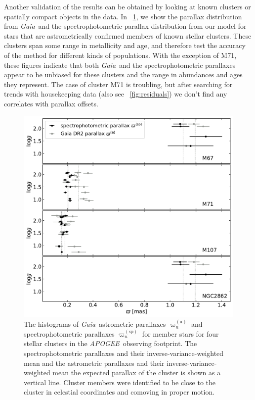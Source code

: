 \documentclass[modern]{aastex62}
\newcommand{\acronym}[1]{{\small{#1}}}
\newcommand{\project}[1]{\textsl{#1}}
\newcommand{\apogee}{\project{\acronym{APOGEE}}}
\newcommand{\gaia}{\project{Gaia}}
\newcommand{\gparallax}{\varpi^{(\mathrm{a})}}
\newcommand{\sparallax}{\varpi^{(\mathrm{sp})}}
\begin{document}
Another validation of the results can be obtained by looking at known
clusters or spatially compact objects in the data.
In \figurename~\ref{fig:clusters}, we show the parallax distribution from \gaia\ and
the spectrophotometric-parallax distribution from our model for stars that are
astrometrically confirmed members of known stellar clusters.
These clusters span some range in metallicity and age, and therefore test
the accuracy of the method for different kinds of populations.
With the exception of \acronym{M71}, these figures 
indicate that both \gaia\ and the spectrophotometric parallaxes appear to be unbiased
for these clusters and the range in abundances and ages they represent.
The case of cluster \acronym{M71} is troubling, but after searching for trends with
housekeeping data (also see \figurename~\ref{fig:residuals}) we don't find any correlates
with parallax offsets.
\begin{figure}
\includegraphics[width=\textwidth]{clusters.pdf}
\caption{The histograms of \gaia\ astrometric parallaxes $\gparallax_n$
  and spectrophotometric parallaxes $\sparallax_n$ for member stars for
  four stellar clusters in the \apogee\ observing footprint. The spectrophotometric
  parallaxes and their inverse-variance-weighted mean and the astrometric parallaxes
  and their inverse-variance-weighted mean
  the expected parallax of the cluster is shown as a vertical line.
  Cluster members were identified to be close to the cluster in celestial coordinates
  and comoving in proper motion.\label{fig:clusters}}
\end{figure}
\end{document}
